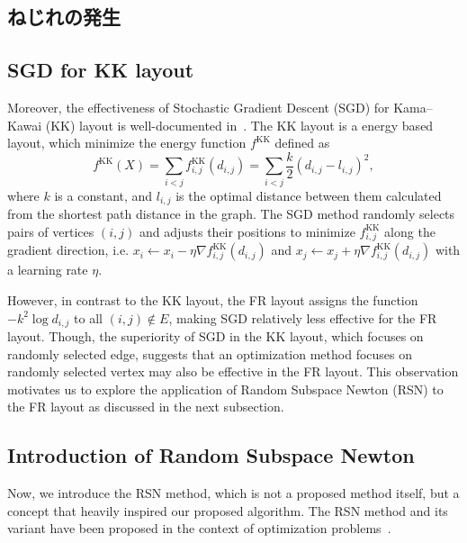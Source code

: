 \documentclass[dvipdfmx,journal]{IEEEtran}
\begin{document}
\subsection{ねじれの発生}\label{ssec:twist}


\subsection{SGD for KK layout}\label{ssec:sgd}

Moreover, the effectiveness of Stochastic Gradient Descent (SGD) for Kama--Kawai (KK) layout is well-documented in~\cite{8419285}.
The KK layout is a energy based layout, which minimize the energy function $f^{\mathrm{KK}}$ defined as
\begin{equation*}
  f^{\mathrm{KK}}(X) = \sum_{i<j} f^{\mathrm{KK}}_{i,j}(d_{i,j}) = \sum_{i<j} \frac{k}{2}(d_{i,j}-l_{i,j})^2,
\end{equation*}
where $k$ is a constant, and $l_{i,j}$ is the optimal distance between them calculated from the shortest path distance in the graph.
The SGD method randomly selects pairs of vertices $(i,j)$ and adjusts their positions to minimize $f^{\mathrm{KK}}_{i,j}$ along the gradient direction, i.e. $x_i \gets x_i - \eta \nabla f^{\mathrm{KK}}_{i,j}(d_{i,j})$ and $x_j \gets x_j + \eta \nabla f^{\mathrm{KK}}_{i,j}(d_{i,j})$ with a learning rate $\eta$.

However, in contrast to the KK layout, the FR layout assigns the function $-k^2\log{d_{i,j}}$ to all $(i,j) \notin E$, making SGD relatively less effective for the FR layout.
Though, the superiority of SGD in the KK layout, which focuses on randomly selected edge, suggests that an optimization method focuses on randomly selected vertex may also be effective in the FR layout.
This observation motivates us to explore the application of Random Subspace Newton (RSN) to the FR layout as discussed in the next subsection.

\subsection{Introduction of Random Subspace Newton}\label{ssec:introRSN}

Now, we introduce the RSN method, which is not a proposed method itself, but a concept that heavily inspired our proposed algorithm.
The RSN method and its variant have been proposed in the context of optimization problems~\cite{NEURIPS2019_bc6dc48b,fujiRandomizedSubspaceRegularized2022,cartisRandomisedSubspaceMethods2022,higuchiFastConvergenceSecondOrder2024}.
\end{document}

